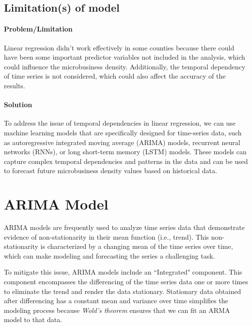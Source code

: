 \documentclass{article}
\begin{document}
\subsection{Limitation(s) of model}
\vspace{1em}
\paragraph{Problem/Limitation} Linear regression didn't work effectively in some counties because there could have been some important predictor variables not included in the analysis, which could influence the microbusiness density. Additionally, the temporal dependency of time series is not considered, which could also affect the accuracy of the results. 
\paragraph{Solution} To address the issue of temporal dependencies in linear regression, we can use machine learning models that are specifically designed for time-series data, such as autoregressive integrated moving average (ARIMA) models, recurrent neural networks (RNNs), or long short-term memory (LSTM) models. These models can capture complex temporal dependencies and patterns in the data and can be used to forecast future microbusiness density values based on historical data.

\vspace{2em}
\section{\centering ARIMA Model}

\vspace{1em}
ARIMA models are frequently used to analyze time series data that demonstrate evidence of non-stationarity in their mean function (i.e., trend). This non-stationarity is characterized by a changing mean of the time series over time, which can make modeling and forecasting the series a challenging task.

\vspace{1em}
To mitigate this issue, ARIMA models include an ``Integrated" component. This component encompasses the differencing of the time series data one or more times to eliminate the trend and render the data stationary. Stationary data obtained after differencing has a constant mean and variance over time simplifies the modeling process because \textit{Wold's theorem} ensures that we can fit an ARMA model to that data. 
\end{document}
